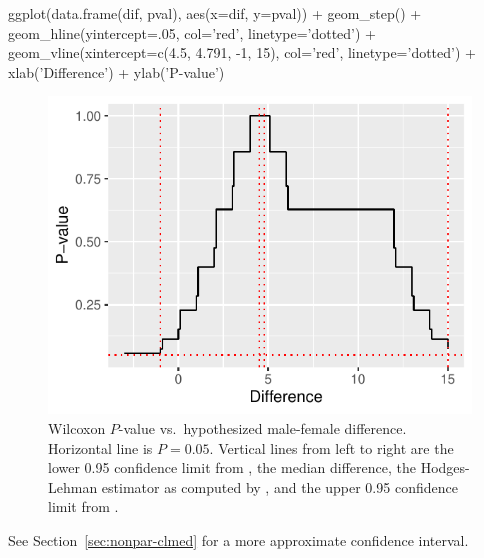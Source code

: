 \begin{Schunk}
\begin{Sinput}
ggplot(data.frame(dif, pval), aes(x=dif, y=pval)) +
  geom_step() +
  geom_hline(yintercept=.05, col='red', linetype='dotted') +
  geom_vline(xintercept=c(4.5, 4.791, -1, 15), col='red', linetype='dotted') +
  xlab('Difference') + ylab('P-value')
\end{Sinput}
\begin{figure}[htbp]

\centerline{\includegraphics[width=\maxwidth]{nonpar-checkhl-1} }

\caption[Wilcoxon $P$-value vs.\ hypothesized difference.]{Wilcoxon $P$-value vs.\ hypothesized male-female difference.  Horizontal line is $P=0.05$.  Vertical lines from left to right are the lower 0.95 confidence limit from , the median difference, the Hodges-Lehman estimator as computed by , and the upper 0.95 confidence limit from .}\label{fig:nonpar-checkhl}
\end{figure}
\end{Schunk}
See Section~\ref{sec:nonpar-clmed} for a more approximate confidence interval.


